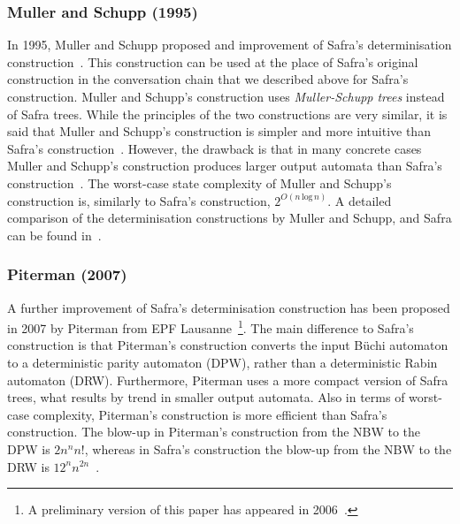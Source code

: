 \subsubsection{Muller and Schupp (1995)}
\label{2_ms95}
In 1995, Muller and Schupp proposed and improvement of Safra's determinisation construction~\cite{Muller199569}. This construction can be used at the place of Safra's original construction in the conversation chain that we described above for Safra's construction. Muller and Schupp's construction uses \textit{Muller-Schupp trees} instead of Safra trees. While the principles of the two constructions are very similar, it is said that Muller and Schupp's construction is simpler and more intuitive than Safra's construction~\cite{2002_roggenbach}. However, the drawback is that in many concrete cases Muller and Schupp's construction produces larger output automata than Safra's construction~\cite{2006_althoff}. The worst-case state complexity of Muller and Schupp's construction is, similarly to Safra's construction, $2^{O\left(n\, \text{log}\, n\right)}$.  A detailed comparison of the determinisation constructions by Muller and Schupp, and Safra can be found in~\cite{2006_althoff}.


\subsubsection{Piterman (2007)}
\label{2_pit07}
A further improvement of Safra's determinisation construction has been proposed in 2007 by Piterman from EPF Lausanne~\cite{2007_piterman}\footnote{A preliminary version of this paper has appeared in 2006~\cite{2006_piterman}.}. The main difference to Safra's construction is that Piterman's construction converts the input Büchi automaton to a deterministic parity automaton (DPW), rather than a deterministic Rabin automaton (DRW). Furthermore, Piterman uses a more compact version of Safra trees, what results by trend in smaller output automata. Also in terms of worst-case complexity, Piterman's construction is more efficient than Safra's construction. The blow-up in Piterman's construction from the NBW to the DPW is $2n^nn!$, whereas in Safra's construction the blow-up from the NBW to the DRW is $12^nn^{2n}$~\cite{2006_piterman,2007_piterman}.

